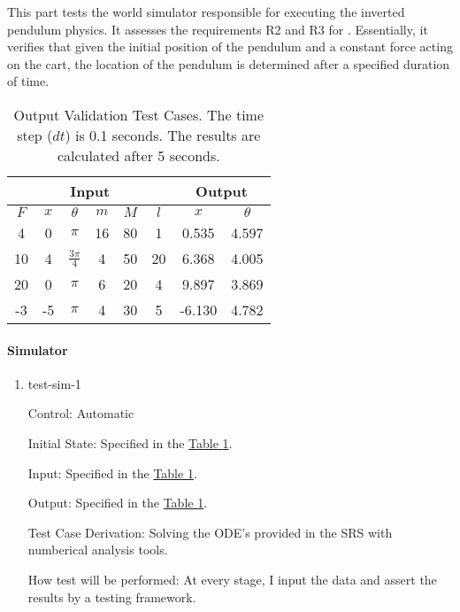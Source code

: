 \documentclass[12pt, titlepage]{article}
\begin{document}
This part tests the world simulator responsible for executing 
the inverted pendulum physics. It assesses the requirements 
R2 and R3 for \progname{}. Essentially, it verifies that given the initial 
position of the pendulum and a constant force acting on the cart, 
the location of the pendulum is determined after a specified duration of time.

\begin{table}[ht]
\centering
\caption{
  Output Validation Test Cases. The time step ($dt$) is 0.1 seconds.
  The results are calculated after 5 seconds.
} \label{table:input_output}
\vspace*{2mm}
 \begin{tabular}{|c c c c c c|c c|} 
 \hline
 \multicolumn{6}{|c|}{Input} & \multicolumn{2}{c|}{Output}\\ \hline 
  $F$ & $x$ & $\theta$         & $m$ & $M$ & $l$ & $x$    & $\theta$ \\ \hline
  4   & 0   & $\pi$            & 16  & 80  &  1  & 0.535  & 4.597    \\ \hline
  10  & 4   & $\frac{3\pi}{4}$ & 4   & 50  &  20 & 6.368  & 4.005    \\ \hline
  20  & 0   & $\pi$            & 6   & 20  &  4  & 9.897  & 3.869    \\ \hline
  -3  & -5  & $\pi$            & 4   & 30  &  5  & -6.130 & 4.782    \\ \hline
\end{tabular}

\end{table}

		
\paragraph{Simulator}

\begin{enumerate}

\item{test-sim-1\\}

Control: Automatic
					
Initial State: Specified in the \hyperref[table:input_output]{Table \ref*{table:input_output}}.
					
Input: Specified in the \hyperref[table:input_output]{Table \ref*{table:input_output}}.
					
Output: Specified in the \hyperref[table:input_output]{Table \ref*{table:input_output}}.

Test Case Derivation: Solving the ODE's provided in the SRS with numberical analysis tools.
					
How test will be performed: 
At every stage, I input the data and assert the results by a testing framework.

\end{enumerate}
\end{document}
